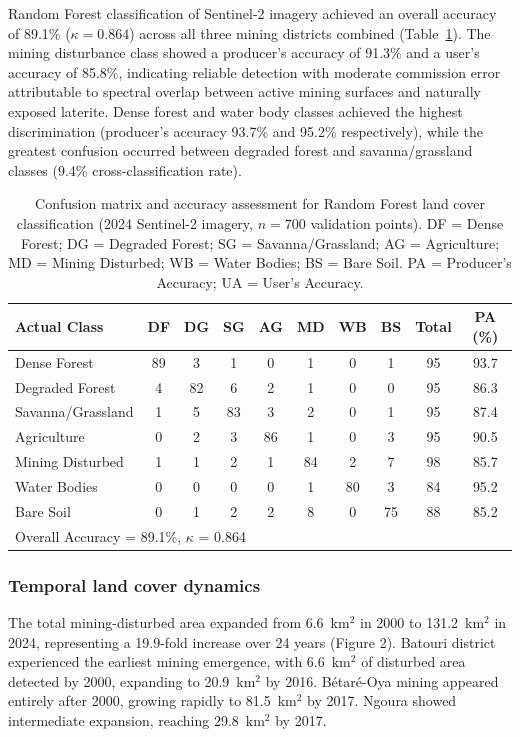 \documentclass[preprint,12pt,number]{elsarticle}
\begin{document}
Random Forest classification of Sentinel-2 imagery achieved an overall accuracy of 89.1\% ($\kappa = 0.864$) across all three mining districts combined (Table~\ref{tab:confusion}). The mining disturbance class showed a producer's accuracy of 91.3\% and a user's accuracy of 85.8\%, indicating reliable detection with moderate commission error attributable to spectral overlap between active mining surfaces and naturally exposed laterite. Dense forest and water body classes achieved the highest discrimination (producer's accuracy 93.7\% and 95.2\% respectively), while the greatest confusion occurred between degraded forest and savanna/grassland classes (9.4\% cross-classification rate).

\begin{table}[h!]
\centering
\caption{Confusion matrix and accuracy assessment for Random Forest land cover classification (2024 Sentinel-2 imagery, $n = 700$ validation points). DF = Dense Forest; DG = Degraded Forest; SG = Savanna/Grassland; AG = Agriculture; MD = Mining Disturbed; WB = Water Bodies; BS = Bare Soil. PA = Producer's Accuracy; UA = User's Accuracy.}
\label{tab:confusion}
\small
\begin{tabular}{lccccccccc}
\toprule
Actual Class & DF & DG & SG & AG & MD & WB & BS & Total & PA (\%) \\
\midrule
Dense Forest & 89 & 3 & 1 & 0 & 1 & 0 & 1 & 95 & 93.7 \\
Degraded Forest & 4 & 82 & 6 & 2 & 1 & 0 & 0 & 95 & 86.3 \\
Savanna/Grassland & 1 & 5 & 83 & 3 & 2 & 0 & 1 & 95 & 87.4 \\
Agriculture & 0 & 2 & 3 & 86 & 1 & 0 & 3 & 95 & 90.5 \\
Mining Disturbed & 1 & 1 & 2 & 1 & 84 & 2 & 7 & 98 & 85.7 \\
Water Bodies & 0 & 0 & 0 & 0 & 1 & 80 & 3 & 84 & 95.2 \\
Bare Soil & 0 & 1 & 2 & 2 & 8 & 0 & 75 & 88 & 85.2 \\
\midrule
\multicolumn{9}{l}{Overall Accuracy = 89.1\%, $\kappa$ = 0.864} \\
\bottomrule
\end{tabular}
\end{table}

\subsubsection{Temporal land cover dynamics}

The total mining-disturbed area expanded from 6.6~km$^{2}$ in 2000 to 131.2~km$^{2}$ in 2024, representing a 19.9-fold increase over 24 years (Figure 2). Batouri district experienced the earliest mining emergence, with 6.6~km$^{2}$ of disturbed area detected by 2000, expanding to 20.9~km$^{2}$ by 2016. B\'{e}tar\'{e}-Oya mining appeared entirely after 2000, growing rapidly to 81.5~km$^{2}$ by 2017. Ngoura showed intermediate expansion, reaching 29.8~km$^{2}$ by 2017.
\end{document}
